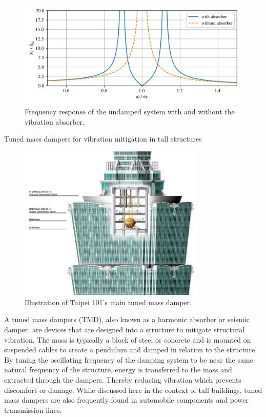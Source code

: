 \documentclass[12pt,letter]{article}
\numberwithin{ex}{section} %
\numberwithin{re}{section} %
\newtheorem{vcs}{Vibration Case Studies}
\numberwithin{vcs}{section} %
\newenvironment{vibration_case_studies}{\begin{mdframed}[linecolor=orange,middlelinewidth=2mm,roundcorner=20pt]\begin{vcs}\normalfont}{\end{vcs}\end{mdframed}}
\begin{document}
\begin{figure}[H]
    \centering
    \includegraphics[width=6.5in]{../figures/vibration_absorber_undamped_results.png}
    \caption{Frequency response of the undamped system with and without the vibration absorber.}
    \label{fig:vibration_absorber_undamped_results}
\end{figure}



\begin{vibration_case_studies}
	Tuned mass dampers for vibration mitigation in tall structures
	\begin{figure}[H]
		\centering
		\includegraphics[width=3.5in]{../figures/Taipei_101_Tuned_Mass_Damper.png}
		\caption{Illustration of Taipei 101's main tuned mass damper. \protect\footnotemark[1]}
	\end{figure}
	
	A tuned mass dampers (TMD), also known as a harmonic absorber or seismic damper, are devices that are designed into a structure to mitigate structural vibration. The mass is typically a block of steel or concrete and is mounted on suspended cables to create a pendulum and damped in relation to the structure. By tuning the oscillating frequency of the damping system to be near the same natural frequency of the structure, energy is transferred to the mass and extracted through the dampers. Thereby reducing vibration which prevents discomfort or damage. While discussed here in the context of tall buildings, tuned mass dampers are also frequently found in automobile components and power transmission lines.	
	
\end{vibration_case_studies}
\end{document}
